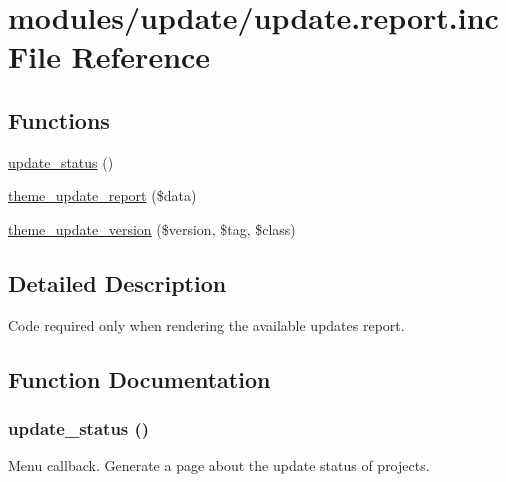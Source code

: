 \hypertarget{update_8report_8inc}{
\section{modules/update/update.report.inc File Reference}
\label{update_8report_8inc}
}
\subsection*{Functions}
\begin{CompactItemize}
\item 
\hyperlink{update_8report_8inc_287045a3ba0dff30d7f84cd7a5a8e8ed}{update\_\-status} ()
\item 
\hyperlink{group__themeable_gc4985959e9c84378884ce60282b6eca2}{theme\_\-update\_\-report} (\$data)
\item 
\hyperlink{group__themeable_g24a724467a0b23d3672b3a253be3695f}{theme\_\-update\_\-version} (\$version, \$tag, \$class)
\end{CompactItemize}


\subsection{Detailed Description}
Code required only when rendering the available updates report. 

\subsection{Function Documentation}
\hypertarget{update_8report_8inc_287045a3ba0dff30d7f84cd7a5a8e8ed}{
\subsubsection[{update\_\-status}]{\setlength{\rightskip}{0pt plus 5cm}update\_\-status ()}}
\label{update_8report_8inc_287045a3ba0dff30d7f84cd7a5a8e8ed}


Menu callback. Generate a page about the update status of projects. 